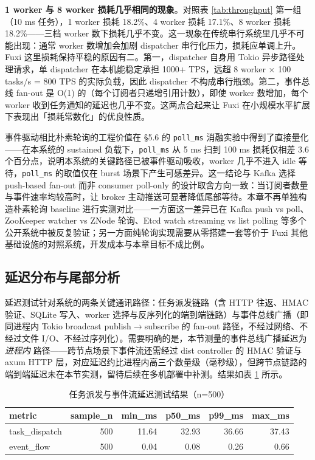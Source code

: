 \textbf{1 worker 与 8 worker 损耗几乎相同的现象}。对照表 \ref{tab:throughput} 第一组（10 ms 任务），1 worker 损耗 18.2\%、4 worker 损耗 17.1\%、8 worker 损耗 18.2\%——三档 worker 数下损耗几乎不变。这一现象在传统串行系统里几乎不可能出现：通常 worker 数增加会加剧 dispatcher 串行化压力，损耗应单调上升。Fuxi 这里损耗保持平稳的原因有二。第一，dispatcher 自身用 Tokio 异步路径处理请求，单 dispatcher 在本机能稳定承担 1000+ TPS，远超 8 worker × 100 tasks/s = 800 TPS 的实际负载，因此 dispatcher 不构成串行瓶颈。第二，事件总线 fan-out 是 O(1) 的（每个订阅者只递增引用计数），即使 worker 数增加，每个 worker 收到任务通知的延迟也几乎不变。这两点合起来让 Fuxi 在小规模水平扩展下表现出「损耗常数化」的优良性质。

事件驱动相比朴素轮询的工程价值在 §5.6 的 \texttt{poll\_ms} 消融实验中得到了直接量化——在本系统的 sustained 负载下，\texttt{poll\_ms} 从 5 ms 扫到 100 ms 损耗仅相差 3.6 个百分点，说明本系统的关键路径已被事件驱动吸收，worker 几乎不进入 idle 等待，\texttt{poll\_ms} 的取值仅在 burst 场景下产生可感差异。这一结论与 Kafka 选择 push-based fan-out 而非 consumer poll-only 的设计取舍\cite{kreps2011kafka}方向一致：当订阅者数量与事件速率均较高时，让 broker 主动推送可显著降低尾部等待。本章不再单独构造朴素轮询 baseline 进行实测对比——一方面这一差异已在 Kafka push vs poll、ZooKeeper watcher vs ZNode 轮询、Etcd watch streaming vs list polling 等多个公开系统中被反复验证\cite{hunt2010zookeeper}\cite{ongaro2014raft}；另一方面纯轮询实现需要从零搭建一套等价于 Fuxi 其他基础设施的对照系统，开发成本与本章目标不成比例。

\subsection{延迟分布与尾部分析}

延迟测试针对系统的两条关键通讯路径：任务派发链路（含 HTTP 往返、HMAC 验证、SQLite 写入、worker 选择与反序列化的端到端链路）与事件总线广播（即同进程内 Tokio broadcast publish$\to$subscribe 的 fan-out 路径，不经过网络、不经过文件 I/O、不经过序列化）。需要明确的是，本节测量的事件总线广播延迟为 \emph{进程内} 路径——跨节点场景下事件流还需经过 dist controller 的 HMAC 验证与 axum HTTP 层，对应延迟约比进程内高三个数量级（毫秒级），但跨节点链路的端到端延迟未在本节实测，留待后续在多机部署中补测。结果如表 \ref{tab:latency} 所示。

\begin{table}[H]
\centering
\caption{任务派发与事件流延迟测试结果（n=500）}
\label{tab:latency}
\begin{tabular}{lrrrrr}
\toprule
metric & sample\_n & min\_ms & p50\_ms & p99\_ms & max\_ms \\
\midrule
task\_dispatch & 500 & 11.64 & 32.93 & 36.66 & 37.43 \\
event\_flow & 500 & 0.04 & 0.08 & 0.26 & 0.66 \\
\bottomrule
\end{tabular}
\end{table}

